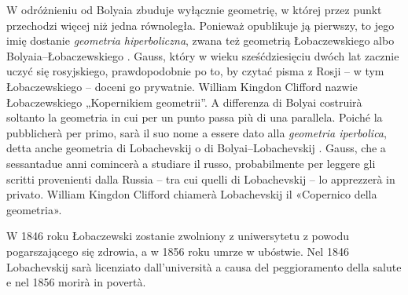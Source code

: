 W odróżnieniu od Bolyaia zbuduje wyłącznie geometrię, w której przez punkt przechodzi więcej niż jedna równoległa. %
Ponieważ opublikuje ją pierwszy, to jego imię dostanie \emph{geometria hiperboliczna}, zwana też geometrią Łobaczewskiego albo Bolyaia--Łobaczewskiego \cite[s. 287]{eves1_1972}. %
Gauss, który w wieku sześćdziesięciu dwóch lat zacznie uczyć się rosyjskiego, prawdopodobnie po to, by czytać pisma z Rosji -- w tym Łobaczewskiego -- doceni go prywatnie. %
William Kingdon Clifford nazwie Łobaczewskiego „Kopernikiem geometrii''. %
A differenza di Bolyai costruirà soltanto la geometria in cui per un punto passa più di una parallela. %
Poiché la pubblicherà per primo, sarà il suo nome a essere dato alla \emph{geometria iperbolica}, detta anche geometria di Lobachevskij o di Bolyai--Lobachevskij \cite[p. 287]{eves1_1972}. %
Gauss, che a sessantadue anni comincerà a studiare il russo, probabilmente per leggere gli scritti provenienti dalla Russia -- tra cui quelli di Lobachevskij -- lo apprezzerà in privato. %
William Kingdon Clifford chiamerà Lobachevskij il «Copernico della geometria». %
%

W 1846 roku Łobaczewski zostanie zwolniony z uniwersytetu z powodu pogarszającego się zdrowia, a w 1856 roku umrze w ubóstwie. %
Nel 1846 Lobachevskij sarà licenziato dall'università a causa del peggioramento della salute e nel 1856 morirà in povertà. %
